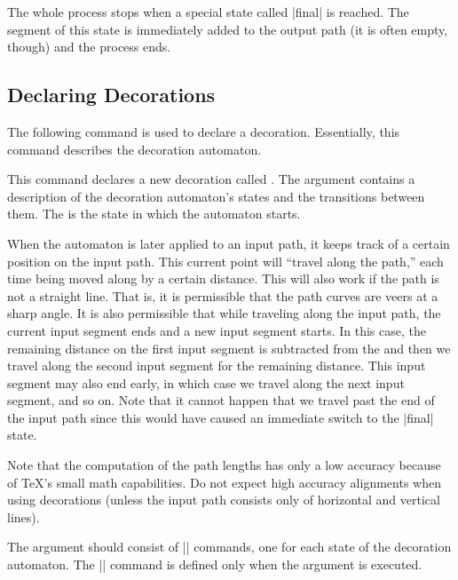 The whole process stops when a special state called |final| is
reached. The segment of this state is immediately added to the output
path (it is often empty, though) and the process ends.




\subsection{Declaring Decorations}

The following command is used to declare a decoration. Essentially,
this command describes the decoration automaton.


\begin{command}{\pgfdeclaredecoration{}}
  This command declares a new decoration called . The
   argument contains a description of the decoration
  automaton's states and the transitions between them. The
   is the state in which the automaton starts.

  When the automaton is later applied to an input path, it keeps track
  of a certain position on the input path. This current point
  will ``travel along the path,'' each time being moved along by a
  certain distance. This will also work if the path is not a straight
  line. That is, it is permissible that the path curves are veers at a
  sharp angle.  It is also permissible that while traveling along the
  input path, the current input segment ends and a new input segment starts. In this
  case, the remaining distance on the first input segment is subtracted
  from the  and then we travel along the second
  input segment for the remaining distance. This input segment may also end
  early, in which case we travel along the next input segment, and so
  on. Note that it cannot happen that we travel past the end of the
  input path since this would have caused an immediate switch to
  the |final| state.

  Note that the computation of the path lengths has only a low
  accuracy because of \TeX's small math capabilities. Do not
  expect high accuracy alignments when using decorations (unless the
  input path consists only of horizontal and vertical lines).

  The  argument should consist of |\state| commands, one
  for each state of the decoration automaton. The |\state| command is
  defined only when the  argument is executed.


\end{command}

